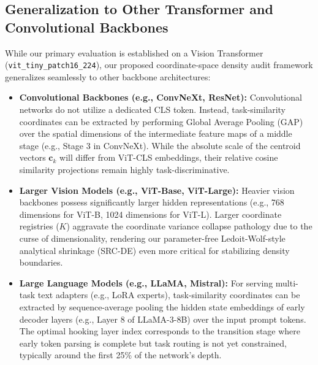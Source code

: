 \documentclass{article}
\theoremstyle{plain}
\theoremstyle{definition}
\theoremstyle{remark}
\begin{document}
\subsection{Generalization to Other Transformer and Convolutional Backbones}
\label{sec:backbone_generalization}
While our primary evaluation is established on a Vision Transformer (\texttt{vit\_tiny\_patch16\_224}), our proposed coordinate-space density audit framework generalizes seamlessly to other backbone architectures:
\begin{itemize}
    \item \textbf{Convolutional Backbones (e.g., ConvNeXt, ResNet):} Convolutional networks do not utilize a dedicated CLS token. Instead, task-similarity coordinates can be extracted by performing Global Average Pooling (GAP) over the spatial dimensions of the intermediate feature maps of a middle stage (e.g., Stage 3 in ConvNeXt). While the absolute scale of the centroid vectors $\mathbf{c}_k$ will differ from ViT-CLS embeddings, their relative cosine similarity projections remain highly task-discriminative.
    \item \textbf{Larger Vision Models (e.g., ViT-Base, ViT-Large):} Heavier vision backbones possess significantly larger hidden representations (e.g., 768 dimensions for ViT-B, 1024 dimensions for ViT-L). Larger coordinate registries ($K$) aggravate the coordinate variance collapse pathology due to the curse of dimensionality, rendering our parameter-free Ledoit-Wolf-style analytical shrinkage (SRC-DE) even more critical for stabilizing density boundaries.
    \item \textbf{Large Language Models (e.g., LLaMA, Mistral):} For serving multi-task text adapters (e.g., LoRA experts), task-similarity coordinates can be extracted by sequence-average pooling the hidden state embeddings of early decoder layers (e.g., Layer 8 of LLaMA-3-8B) over the input prompt tokens. The optimal hooking layer index corresponds to the transition stage where early token parsing is complete but task routing is not yet constrained, typically around the first 25\% of the network's depth.
\end{itemize}
\end{document}
